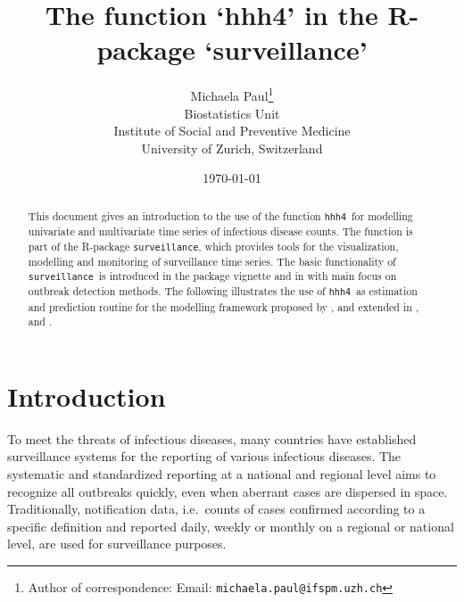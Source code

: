 \documentclass[a4paper,11pt]{article}
\title{The function `hhh4' in the R-package `surveillance'}  %
\author{
Michaela Paul\thanks{Author of correspondence: Email: \texttt{michaela.paul@ifspm.uzh.ch}}\\
Biostatistics Unit\\
Institute of Social and Preventive Medicine\\
University of Zurich, Switzerland
}
\date{\today}
\newcommand{\surveillance}{\texttt{surveillance}}
\newcommand{\hhh}{\texttt{hhh4}}
\newcommand{\R}{\textsf{R}}
\begin{document}









\maketitle  

\begin{abstract}
  \noindent This document gives an introduction to the use of the function 
  \hhh\ for modelling univariate and multivariate time series of infectious 
  disease counts. The function is part of the \R-package \surveillance, 
  which provides tools for the visualization, modelling and monitoring of 
  surveillance time series. 
  The basic functionality of \surveillance\ is introduced in 
  the package vignette \citep{vignette} and in \cite{hoehle-2007} with main 
  focus on outbreak detection methods. The following illustrates the use 
  of \hhh\ as estimation and prediction routine for the modelling framework 
  proposed by \citet{held-etal-2005}, and extended in \citet{paul-etal-2008}, 
  \citet{paul-held-2011} and \citet{herzog-etal-2010}.
\end{abstract}


\section{Introduction}\label{sec:intro}

To meet the threats of infectious diseases, many countries have established
surveillance systems for the reporting of various infectious diseases.
The systematic and standardized reporting at a national and regional level 
aims to recognize all outbreaks quickly, even when aberrant cases are 
dispersed in space. Traditionally, notification data, i.e.\ counts of cases 
confirmed according to a specific definition and reported daily, weekly or 
monthly on a regional or national level, are used for surveillance purposes.
\end{document}
